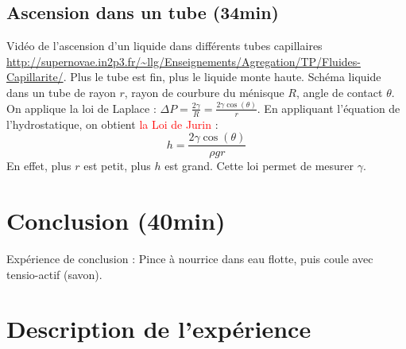 \documentclass[11pt]{report}
\numberwithin{figure}{section}
\numberwithin{equation}{section}
\numberwithin{table}{section}
\newcommand{\1}{\boldsymbol{1}}
\begin{document}
  \subsection{Ascension dans un tube (34min)}
  Vidéo de l'ascension d'un liquide dans différents tubes capillaires \url{http://supernovae.in2p3.fr/~llg/Enseignements/Agregation/TP/Fluides-Capillarite/}. Plus le tube est fin, plus le liquide monte haute.
  Schéma liquide dans un tube de rayon $r$, rayon de courbure du ménisque $R$, angle de contact $\theta$. On applique la loi de Laplace : $\Delta P = \frac{2\gamma}{R}=\frac{2\gamma\cos(\theta)}{r}$. En appliquant l'équation de l'hydrostatique, on obtient \textcolor{red}{la Loi de Jurin} :
  \begin{equation}
      h = \frac{2\gamma\cos(\theta)}{\rho g r}
  \end{equation}
  En effet, plus $r$ est petit, plus $h$ est grand. Cette loi permet de mesurer $\gamma$.
  
  \section*{Conclusion (40min)}

  Expérience de conclusion : Pince à nourrice dans eau flotte, puis coule avec tensio-actif (savon).


\section*{Description de l'expérience}
\end{document}
